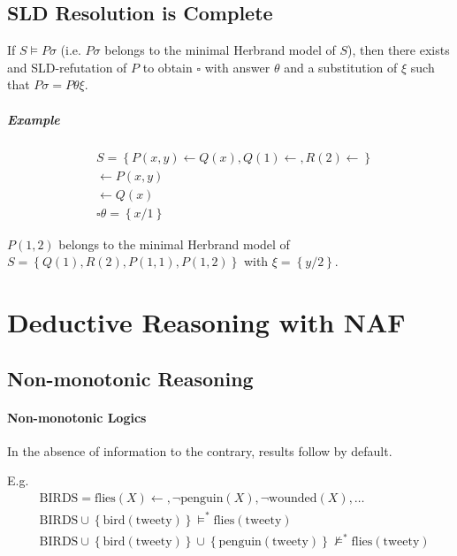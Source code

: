 \documentclass[twocolumn,english]{article}
\begin{document}
\subsection{SLD Resolution is Complete}

If $S\vDash P\sigma$ (i.e. $P\sigma$ belongs to the minimal Herbrand
model of $S$), then there exists and SLD-refutation of $P$ to obtain
$\square$ with answer $\theta$ and a substitution of $\xi$ such
that $P\sigma=P\theta\xi$.

\subparagraph{Example}

\begin{align*}
 & S=\left\{ P\left(x,y\right)\leftarrow Q\left(x\right),Q\left(1\right)\leftarrow,R\left(2\right)\leftarrow\right\} \\
 & \leftarrow P\left(x,y\right)\\
 & \leftarrow Q\left(x\right)\\
 & \square\theta=\left\{ x/1\right\} 
\end{align*}

$P\left(1,2\right)$ belongs to the minimal Herbrand model of $S=\left\{ Q\left(1\right),R\left(2\right),P\left(1,1\right),P\left(1,2\right)\right\} $
with $\xi=\left\{ y/2\right\} $.

\section{Deductive Reasoning with NAF}

\subsection{Non-monotonic Reasoning}

\paragraph{Non-monotonic Logics}

In the absence of information to the contrary, results follow by default.

E.g.
\begin{align*}
 & \text{BIRDS}=\text{flies}\left(X\right)\leftarrow,\lnot\text{penguin}\left(X\right),\lnot\text{wounded}\left(X\right),\dots\\
 & \text{BIRDS}\cup\left\{ \text{bird}\left(\text{tweety}\right)\right\} \vDash^{*}\text{flies}\left(\text{tweety}\right)\\
 & \text{BIRDS}\cup\left\{ \text{bird}\left(\text{tweety}\right)\right\} \cup\left\{ \text{penguin}\left(\text{tweety}\right)\right\} \not\vDash^{*}\text{flies}\left(\text{tweety}\right)
\end{align*}
\end{document}
